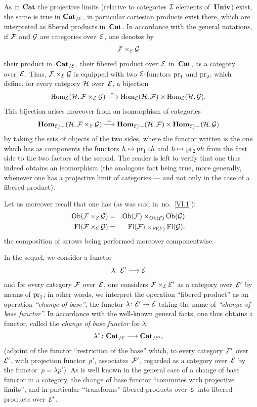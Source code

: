 As in $\Cat$ the projective limits (relative to
categories $\cal{I}$ elements of~$\Univ$) exist, the same
is true in $\Cat_{/\cal{E}}$, in particular cartesian
products exist there, which are interpreted as fibered
products in~$\Cat$. In accordance with the general
notations, if $\cal{F}$ and $\cal{G}$ are categories
over~$\cal{E}$, one denotes by
$$
\cal{F}\times_{\cal{E}}\cal{G}
$$
their product in~$\Cat_{/\cal{E}}$, \ie their fibered product
over~$\cal{E}$ in~$\Cat$,
as a category over~$\cal{E}$. Thus,
$\cal{F}\times_{\cal{E}} \cal{G}$ is equipped with two $\cal{E}$-functors
$\pr_1$ and $\pr_2$, which define, for every category
$\cal{H}$ over~$\cal{E}$, a bijection
$$
\Hom_{\cal{E}}(\cal{H},\cal{F}\times_{\cal{E}}\cal{G})\isomto
\Hom_{\cal{E}}(\cal{H},\cal{F})\times\Hom_{\cal{E}}(\cal{H},\cal{G}).
$$
This bijection arises moreover from an isomorphism of
categories
$$
\SheafHom_{\cal{E}/-}(\cal{H},\cal{F}\times_{\cal{E}}
\cal{G})\isomto\SheafHom_{\cal{E}/-}(\cal{H},\cal{F})\times
\SheafHom_{\cal{E}/-}(\cal{H},\cal{G})
$$
by taking the sets of objects of the two sides, where the functor
written is the one which has as components the functors $h\mto
\pr_1\circ h$ and $h\mto \pr_2\circ h$ from the first side to the two
factors of the second. The reader is left to verify that one
thus indeed obtains an isomorphism (the analogous fact being true,
more generally, whenever one has a projective limit
of categories --- and not only in the case of a fibered
product).

Let us moreover recall that one has (as was said in~no.~\ref{VI.1}):
\begin{eqnarray*}
\Ob(\cal{F}\times_\cal{E}\cal{G})&=&
\Ob(\cal{F})\times_{\Ob(\cal{E})}\Ob(\cal{G})\\
\Fl(\cal{F}\times_\cal{E}\cal{G})&=&
\Fl(\cal{F})\times_{\Fl(\cal{E})}\Fl(\cal{G})\quoi,
\end{eqnarray*}
the composition of arrows being performed moreover
componentwise.

In the sequel, we consider a functor
$$
\lambda\colon\cal{E}'\to\cal{E}
$$
and for every category $\cal{F}$ over~$\cal{E}$, one
considers $\cal{F}\times_\cal{E}\cal{E}'$ as a category
over~$\cal{E}'$ by means of $\pr_2$; in other words,
we interpret the operation ``fibered product'' as an
operation \emph{``change of base''}, the functor
$\lambda\colon\cal{E}'\to\cal{E}$ taking the name of \emph{``change of
base functor''.}
In accordance with the well-known general facts, one thus obtains
a functor, called the
\emph{change of base functor} for $\lambda$:
$$
\lambda^*\colon\Cat_{/\cal{E}}\to\Cat_{/\cal{E}'}\quoi,
$$
(adjoint of the functor ``restriction of the base'' which, to every
category $\cal{F}'$ over~$\cal{E}'$, with
projection functor~$p'$, associates~$\cal{F}'$, regarded as a
category over~$\cal{E}$ by the functor~$p=\lambda
p'$). As is well known in the general case of a
change of base functor in a category, the
change of base functor ``commutes with projective limits'', and in
particular ``transforms'' fibered products over~$\cal{E}$ into
fibered products over~$\cal{E}'$.

